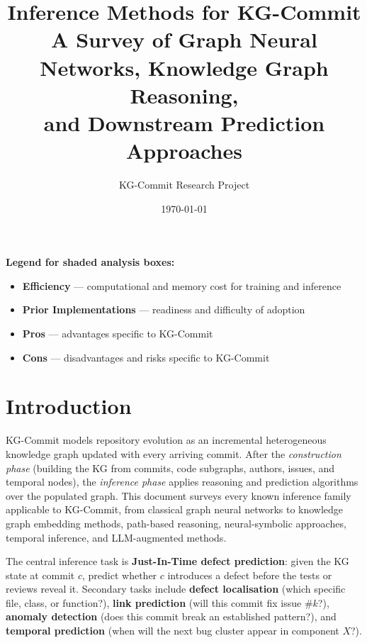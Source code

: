 \documentclass[12pt,a4paper]{article}
\title{\textbf{Inference Methods for KG-Commit}\\
\large A Survey of Graph Neural Networks, Knowledge Graph Reasoning,\\
and Downstream Prediction Approaches}
\author{KG-Commit Research Project}
\date{\today}
\begin{document}
\maketitle

\noindent\textbf{Legend for shaded analysis boxes:}
\begin{itemize}[noitemsep,leftmargin=1.5em]
  \item \colorbox{blue!5}{\textbf{Efficiency}} --- computational and memory cost for training and inference
  \item \colorbox{green!6}{\textbf{Prior Implementations}} --- readiness and difficulty of adoption
  \item \colorbox{teal!5}{\textbf{Pros}} --- advantages specific to KG-Commit
  \item \colorbox{red!5}{\textbf{Cons}} --- disadvantages and risks specific to KG-Commit
\end{itemize}

\tableofcontents
\newpage

\section{Introduction}

KG-Commit models repository evolution as an incremental heterogeneous knowledge
graph updated with every arriving commit. After the \emph{construction phase}
(building the KG from commits, code subgraphs, authors, issues, and temporal
nodes), the \emph{inference phase} applies reasoning and prediction algorithms
over the populated graph. This document surveys every known inference family
applicable to KG-Commit, from classical graph neural networks to knowledge graph
embedding methods, path-based reasoning, neural-symbolic approaches, temporal
inference, and LLM-augmented methods.

The central inference task is \textbf{Just-In-Time defect prediction}: given the
KG state at commit $c$, predict whether $c$ introduces a defect before the tests
or reviews reveal it. Secondary tasks include \textbf{defect localisation}
(which specific file, class, or function?), \textbf{link prediction} (will this
commit fix issue \#$k$?), \textbf{anomaly detection} (does this commit break an
established pattern?), and \textbf{temporal prediction} (when will the next bug
cluster appear in component $X$?).
\end{document}

